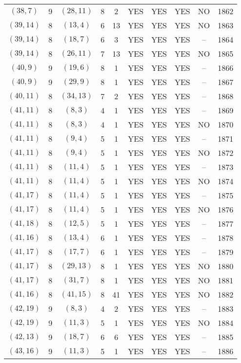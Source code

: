 \begin{longtable}{|c|c|c|c|c|c|c|c|c|c|}
$(38, 7)$ & 9 & $(28, 11)$ & 8 & 2 & YES & YES & YES & NO & 1862\\
$(39, 14)$ & 8 & $(13, 4)$ & 6 & 13 & YES & YES & YES & NO & 1863\\
$(39, 14)$ & 8 & $(18, 7)$ & 6 & 3 & YES & YES & YES & -- & 1864\\
$(39, 14)$ & 8 & $(26, 11)$ & 7 & 13 & YES & YES & YES & NO & 1865\\
$(40, 9)$ & 9 & $(19, 6)$ & 8 & 1 & YES & YES & YES & -- & 1866\\
$(40, 9)$ & 9 & $(29, 9)$ & 8 & 1 & YES & YES & YES & -- & 1867\\
$(40, 11)$ & 8 & $(34, 13)$ & 7 & 2 & YES & YES & YES & -- & 1868\\
$(41, 11)$ & 8 & $(8, 3)$ & 4 & 1 & YES & YES & YES & -- & 1869\\
$(41, 11)$ & 8 & $(8, 3)$ & 4 & 1 & YES & YES & YES & NO & 1870\\
$(41, 11)$ & 8 & $(9, 4)$ & 5 & 1 & YES & YES & YES & -- & 1871\\
$(41, 11)$ & 8 & $(9, 4)$ & 5 & 1 & YES & YES & YES & NO & 1872\\
$(41, 11)$ & 8 & $(11, 4)$ & 5 & 1 & YES & YES & YES & -- & 1873\\
$(41, 11)$ & 8 & $(11, 4)$ & 5 & 1 & YES & YES & YES & NO & 1874\\
$(41, 17)$ & 8 & $(11, 4)$ & 5 & 1 & YES & YES & YES & -- & 1875\\
$(41, 17)$ & 8 & $(11, 4)$ & 5 & 1 & YES & YES & YES & NO & 1876\\
$(41, 18)$ & 8 & $(12, 5)$ & 5 & 1 & YES & YES & YES & -- & 1877\\
$(41, 16)$ & 8 & $(13, 4)$ & 6 & 1 & YES & YES & YES & -- & 1878\\
$(41, 17)$ & 8 & $(17, 7)$ & 6 & 1 & YES & YES & YES & -- & 1879\\
$(41, 17)$ & 8 & $(29, 13)$ & 8 & 1 & YES & YES & YES & NO & 1880\\
$(41, 17)$ & 8 & $(31, 7)$ & 8 & 1 & YES & YES & YES & NO & 1881\\
$(41, 16)$ & 8 & $(41, 15)$ & 8 & 41 & YES & YES & YES & NO & 1882\\
$(42, 19)$ & 9 & $(8, 3)$ & 4 & 2 & YES & YES & YES & -- & 1883\\
$(42, 19)$ & 9 & $(11, 3)$ & 5 & 1 & YES & YES & YES & NO & 1884\\
$(42, 13)$ & 9 & $(18, 7)$ & 6 & 6 & YES & YES & YES & -- & 1885\\
$(43, 16)$ & 9 & $(11, 3)$ & 5 & 1 & YES & YES & YES & -- & 1886\\

\end{longtable}
